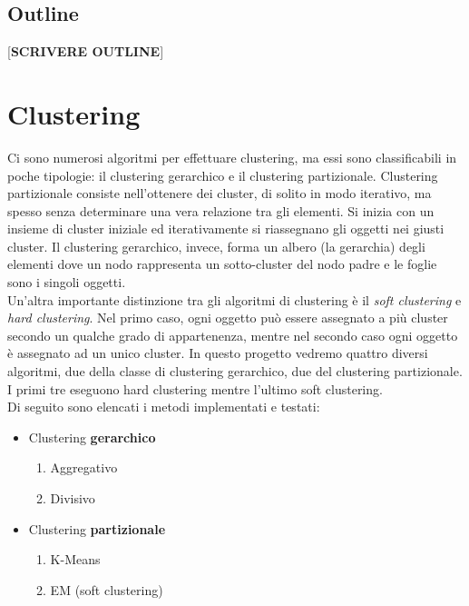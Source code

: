 \documentclass{llncs}
\newcommand{\acapo}{\vspace{0.5\baselineskip}\\}
\begin{document}
	\subsection{Outline}
	[\textbf{SCRIVERE OUTLINE}]
	\section{Clustering}
	Ci sono numerosi algoritmi per effettuare clustering, ma essi sono classificabili in poche tipologie: il clustering gerarchico e il clustering partizionale.
	Clustering partizionale consiste nell'ottenere dei cluster, di solito in modo iterativo, ma spesso senza determinare una vera relazione tra gli elementi. Si inizia con un insieme di cluster iniziale ed iterativamente
	si riassegnano gli oggetti nei giusti cluster. Il clustering gerarchico, invece, forma un albero (la gerarchia) degli elementi dove un nodo rappresenta un sotto-cluster del nodo padre e le foglie sono i singoli
	oggetti.
	\acapo
	Un'altra importante distinzione tra gli algoritmi di clustering è il \textit{soft clustering} e \textit{hard clustering}. Nel primo caso, ogni oggetto può essere assegnato a più cluster secondo un qualche
	grado di appartenenza, mentre nel secondo caso ogni oggetto è assegnato ad un unico cluster. In questo progetto vedremo quattro diversi algoritmi, due della classe di clustering gerarchico, due del clustering partizionale.
	I primi tre eseguono hard clustering mentre l'ultimo soft clustering.
	\acapo
	Di seguito sono elencati i metodi implementati e testati:
	\begin{itemize}
		\item Clustering \textbf{gerarchico}
		\begin{enumerate}
			\item Aggregativo
			\item Divisivo
		\end{enumerate}

		\item Clustering \textbf{partizionale}
		\begin{enumerate}
			\item K-Means
			\item EM (soft clustering)
		\end{enumerate}
	\end{itemize}
	
\end{document}
